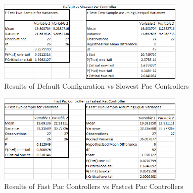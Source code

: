 \documentclass{article}
\begin{document}
\begin{flushleft}
\begin{figure}[h]
	\centering
	\includegraphics[width=0.8\textwidth]{statDefaultVsSlowest}
	\caption{Results of Default Configuration vs Slowest Pac Controllers}
\end{figure}

\clearpage

\begin{figure}[h]
	\centering
	\includegraphics[width=0.8\textwidth]{statsFastVsFastest}
	\caption{Results of Fast Pac Controllers vs Fastest Pac Controllers}
\end{figure}
\end{flushleft}

\vspace{15mm}
\end{document}

